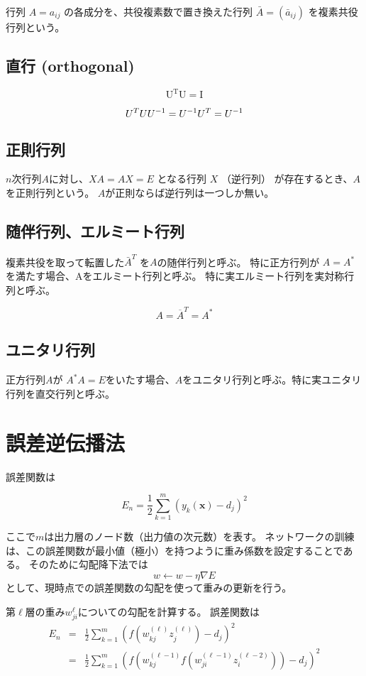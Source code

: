 \documentclass[a4j, uplatex]{jsarticle}
\begin{document}
行列 $A=a_{ij}$ の各成分を、共役複素数で置き換えた行列 $\bar{A} = (\bar{a}_{ij})$ を複素共役行列という。


\subsection{直行 (orthogonal)}

$$
\mathrm{U^TU = I}
$$

$$
U^TUU^{-1} = U^{-1} \\
U^T = U^{-1}
$$


\subsection{正則行列}

$n$次行列$A$に対し、$XA=AX=E$ となる行列 $X$ （逆行列） が存在するとき、$A$を正則行列という。
$A$が正則ならば逆行列は一つしか無い。

\subsection{随伴行列、エルミート行列}

複素共役を取って転置した$\bar{A}^T$ を$A$の随伴行列と呼ぶ。
特に正方行列が $A=A^\ast$を満たす場合、Aをエルミート行列と呼ぶ。
特に実エルミート行列を実対称行列と呼ぶ。

$$
A = \overline{A}^T = A^\ast
$$


\subsection{ユニタリ行列}

正方行列$A$が $A^\ast A=E$をいたす場合、$A$をユニタリ行列と呼ぶ。特に実ユニタリ行列を直交行列と呼ぶ。




\section{誤差逆伝播法}

誤差関数は

\begin{equation}
    E_n = \frac{1}{2} \sum_{k=1}^{m} (y_k(\bm{x}) - d_j)^2
\end{equation}

ここで$m$は出力層のノード数（出力値の次元数）を表す。
ネットワークの訓練は、この誤差関数が最小値（極小）を持つように重み係数を設定することである。
そのために勾配降下法では
\begin{equation}
    w \leftarrow w - \eta \nabla E 
\end{equation}
として、現時点での誤差関数の勾配を使って重みの更新を行う。

第$\ell$層の重み$w_{ji}^\ell$についての勾配を計算する。
誤差関数は
\begin{eqnarray}
    E_n 
    &=& \frac{1}{2} \sum_{k=1}^{m} \left( f \left( w_{kj}^{(\ell)}z_j^{(\ell)} \right) - d_j \right)^2 \\
    &=& \frac{1}{2} \sum_{k=1}^{m} \left( f \left( w_{kj}^{(\ell-1)} f \left( w_{ji}^{(\ell-1)}z_i^{(\ell-2)} \right)\right) - d_j \right)^2 \\
\end{eqnarray}
\end{document}
